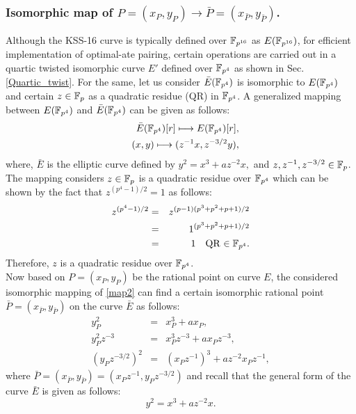 \subsubsection{Isomorphic map of $P=(x_P,y_P) \to \bar P=(x_{\bar P},y_{\bar P})$.}
Although the KSS-16 curve is typically defined over $\mathbb{F}_{p^{16}}$ as $E(\mathbb{F}_{p^{16}})$, for efficient implementation of optimal-ate pairing, certain operations are carried out in a quartic twisted isomorphic curve $E'$ defined over $\mathbb{F}_{p^4}$ as shown in Sec. \ref{Quartic_twist}. 
For the same, let us consider $\bar{E}(\mathbb{F}_{p^4})$ is isomorphic to $E(\mathbb{F}_{p^4})$ and certain $z \in {\mathbb{F}}_{p}$ as a quadratic residue (QR) in $\mathbb{F}_{p^4}$. 
A generalized mapping between $E(\mathbb{F}_{p^4})$ and $\bar{E}(\mathbb{F}_{p^4})$ can be given as follows:
\begin{eqnarray}
&&\bar{E}(\mathbb{F}_{p^4})[r]\longmapsto E(\mathbb{F}_{p^4})[r],\nonumber\\
&&(x,y)\longmapsto (z^{-1}x,z^{-3/2}y),\label{map2}\nonumber
\end{eqnarray}
where,  $\bar{E}$ is the elliptic curve defined by  $ y^2=x^3+az^{-2}x,$ and $z, z^{-1},z^{-3/2}\in {\mathbb{F}}_{p}$.\\
The mapping considers $z \in {\mathbb{F}}_{p}$ is a quadratic residue over $\mathbb{F}_{p^4}$ which can be shown by the fact that $z^{(p^4-1)/2} = 1$ as follows:
\begin{eqnarray}
z^{(p^4-1)/2}& = &z^{(p-1)(p^3+p^2+p+1)/2 } \nonumber \\
& = &1^{(p^3+p^2+p+1)/2 } \nonumber \\
& = & 1 \quad \text{QR $\in \mathbb{F}_{p^4}$}.
\end{eqnarray}
Therefore, $z$ is a quadratic residue over $\mathbb{F}_{p^4}$.\\
Now  based on $P= (x_P, y_P)$ be the rational point on curve $E$, the considered isomorphic mapping of \eqref{map2}  can find a certain isomorphic rational point $\bar P = (x_{\bar P}, y_{\bar P})$ on the curve $\bar E$ as follows:
\begin{eqnarray}\label{bar_P}
y_P^2 & = & x_P^3+ax_P, \nonumber \\
y_P^2 z^{-3}& = & x_P^3 z^{-3} +ax_Pz^{-3}, \nonumber \\
(y_P z^{-3/2})^2& = & (x_Pz^{-1})^3 +az^{-2} x_Pz^{-1},
\end{eqnarray}
where $\bar P = (x_{\bar P}, y_{\bar P}) = (x_P z^{-1},y_P z^{-3/2})$ and recall that the general form of the curve $\bar E$ is given as follows:
\begin{equation}\label{isomorphic_E_bar}
y^2 = x^3+az^{-2}x.
\end{equation}
